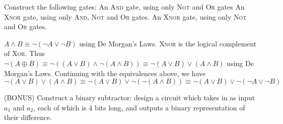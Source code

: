 \documentclass[solution, letterpaper]{cs20inclass}
\begin{document}
\problem
Construct the following gates:
\subproblem An \textsc{And} gate, using only \textsc{Not} and \textsc{Or} gates
\subproblem An \textsc{Xnor} gate, using only \textsc{And}, \textsc{Not} and \textsc{Or} gates.
\subproblem An \textsc{Xnor} gate, using only \textsc{Not} and \textsc{Or} gates.

\begin{solution}
\subsolution $A \land B \equiv \lnot (\lnot A \lor \lnot B)$ using De Morgan's Laws.
\subsolution \textsc{Xnor} is the logical complement of \textsc{Xor}. Thus $\lnot (A \oplus B) \equiv \lnot((A \lor B) \land \lnot (A \land B)) \equiv \lnot (A \lor B) \lor (A \land B)$ using De Morgan's Laws.
\subsolution Continuing with the equivalences above, we have $\lnot (A \lor B) \lor (A \land B) \equiv \lnot (A \lor B) \lor \lnot (\lnot (A \land B)) \equiv \lnot (A \lor B) \lor \lnot (\lnot A \lor \lnot B)$
\end{solution}
  
\problem
(BONUS) Construct a binary subtractor: design a circuit which takes in as input $a_1$ and $a_2$, each of which is $4$ bits long, and outputs a binary representation of their difference.
\end{document}
